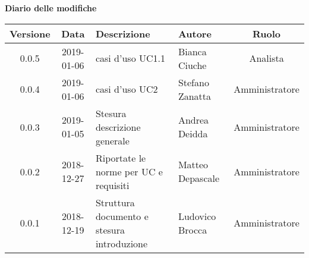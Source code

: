 	\begin{center}
		\textbf{Diario delle modifiche}
	\end{center}
	\begin{center}
		\begin{tabularx}{\textwidth}{|c|c|X|X|c|}
			\hline
			\textbf{Versione} & \textbf{Data} & \textbf{Descrizione} & \textbf{Autore} & \textbf{Ruolo} \\
			\hline
			0.0.5 & 2019-01-06 & casi d'uso UC1.1& Bianca Ciuche & Analista\\
			\hline
			0.0.4 & 2019-01-06 & casi d'uso UC2& Stefano Zanatta & Amministratore\\
			\hline
			0.0.3 & 2019-01-05 & Stesura descrizione generale& Andrea Deidda & Amministratore\\
			\hline
			0.0.2 & 2018-12-27 & Riportate le norme per UC e requisiti& Matteo Depascale & Amministratore\\
			\hline
			0.0.1 & 2018-12-19 & Struttura documento e stesura introduzione& Ludovico Brocca & Amministratore\\
			\hline
		\end{tabularx}
	\end{center}
\newpage
